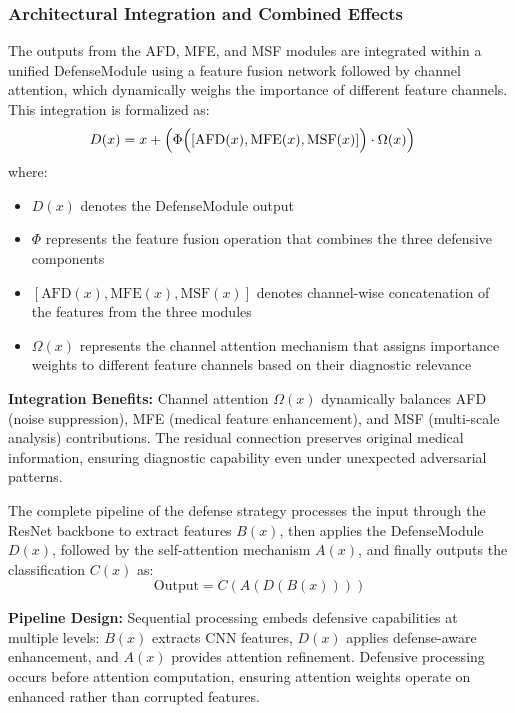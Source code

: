 \documentclass[preprint,12pt]{elsarticle}
\begin{document}
\subsubsection{Architectural Integration and Combined Effects}
The outputs from the AFD, MFE, and MSF modules are integrated within a unified DefenseModule using a feature fusion network followed by channel attention, which dynamically weighs the importance of different feature channels. This integration is formalized as:
\begin{align}
D(x) &= x + \Bigl(
\Phi\Bigl([\text{AFD}(x), \text{MFE}(x), \text{MSF}(x)]\Bigr)\cdot\Omega(x)\Bigr)
\end{align}
where:
\begin{itemize}
    \item $D(x)$ denotes the DefenseModule output
    \item $\Phi$ represents the feature fusion operation that combines the three defensive components
    \item $[\text{AFD}(x), \text{MFE}(x), \text{MSF}(x)]$ denotes channel-wise concatenation of the features from the three modules
    \item $\Omega(x)$ represents the channel attention mechanism that assigns importance weights to different feature channels based on their diagnostic relevance
\end{itemize}

\textbf{Integration Benefits:} Channel attention $\Omega(x)$ dynamically balances AFD (noise suppression), MFE (medical feature enhancement), and MSF (multi-scale analysis) contributions. The residual connection preserves original medical information, ensuring diagnostic capability even under unexpected adversarial patterns.

The complete pipeline of the defense strategy processes the input through the ResNet backbone to extract features $B(x)$, then applies the DefenseModule $D(x)$, followed by the self-attention mechanism $A(x)$, and finally outputs the classification $C(x)$ as:
\begin{equation}
\text{Output} = C(A(D(B(x))))
\end{equation}

\textbf{Pipeline Design:} Sequential processing embeds defensive capabilities at multiple levels: $B(x)$ extracts CNN features, $D(x)$ applies defense-aware enhancement, and $A(x)$ provides attention refinement. Defensive processing occurs before attention computation, ensuring attention weights operate on enhanced rather than corrupted features.
\end{document}
